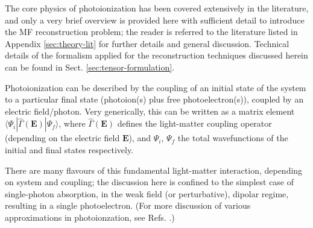 \documentclass[10pt]{article}
\begin{document}


The core physics of photoionization has been covered extensively in the literature, and only a very brief overview is provided here with sufficient detail to introduce the MF reconstruction problem; the reader is referred to the literature listed in Appendix \ref{sec:theory-lit} for further details and general discussion. Technical details of the formalism applied for the reconstruction techniques discussed herein can be found in Sect. \ref{sec:tensor-formulation}.

Photoionization can be described by the coupling of an initial state of the system to a particular final state (photoion(s) plus free photoelectron(s)), coupled by an electric field/photon. Very generically, this can be written as a matrix element $\langle\Psi_i|\hat{\Gamma}(\boldsymbol{\mathbf{E}})|\Psi_f\rangle$, where $\hat{\Gamma}(\boldsymbol{\mathbf{E}})$ defines the light-matter coupling operator (depending on the electric field $\boldsymbol{\mathbf{E}}$), and $\Psi_i$, $\Psi_f$ the total wavefunctions of the initial and final states respectively. 

There are many flavours of this fundamental light-matter interaction, depending on system and coupling; the discussion here is confined to the simplest case of single-photon absorption, in the weak field (or perturbative), dipolar regime, resulting in a single photoelectron. (For more discussion of various approximations in photoionzation, see Refs. \cite{Seideman2002,Seideman2001}.)

\end{document}
